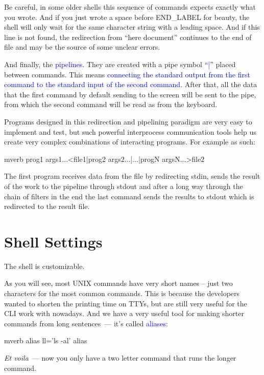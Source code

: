 \documentclass[12pt]{report}
\newcommand{\struct}[1]{\textcolor{blue}{#1}}
\newcommand{\cmd}[1]{\textcolor{blue}{#1}}
\begin{document}
\medskip
Be careful, in some older shells this sequence of commands expects
exactly what you wrote. And if you just wrote a space before END\_LABEL
for beauty, the shell will only wait for the same character string with a
leading space. And if this line is not found, the redirection from ``here
document'' continues to the end of file and may be the source of some
unclear errors.

\medskip
And finally, the \struct{pipelines}. They are created with a pipe
symbol ``\cmd{|}'' placed between commands. This means \struct{connecting
the standard output from the first command to the standard input of
the second command}. After that, all the data that the first command by default
sending to the screen will be sent to the pipe, from which the second command
will be read as from the keyboard.

\medskip
Programs designed in this redirection and pipelining paradigm are very
easy to implement and test, but such powerful interprocess communication
tools help us create very complex combinations of interacting programs.
For example as such:
\begin{code}{mverb}
prog1 args1...<file1|prog2 args2...|...|progN argsN...>file2
\end{code}
The first program receives data from the file by redirecting stdin, sends
the result of the work to the pipeline through stdout and after a long
way through the chain of filters in the end the last command sends the
results to stdout which is redirected to the result file.


\section*{Shell Settings}

The shell is customizable.

\medskip
As you will see, most UNIX commands have very short names -- just two
characters for the most common commands. This is because the developers
wanted to shorten the printing time on TTYs, but are still very useful
for the CLI work with nowadays. And we have a very useful tool for making
shorter commands from long sentences~--- it's called \struct{aliases}:
\begin{code}{mverb}
alias ll='ls -al'
alias
\end{code}

\medskip
\emph{Et voila}~--- now you only have a two letter command that runs
the longer command.
\end{document}
